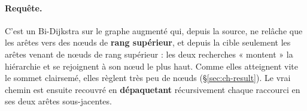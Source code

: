 \paragraph{Requête.} C'est un Bi-Dijkstra sur le graphe augmenté qui, depuis la
source, ne relâche que les arêtes vers des nœuds de \textbf{rang supérieur}, et
depuis la cible seulement les arêtes venant de nœuds de rang supérieur : les deux
recherches « montent » la hiérarchie et se rejoignent à son nœud le plus haut.
Comme elles atteignent vite le sommet clairsemé, elles règlent très peu de nœuds
(\S\ref{sec:ch-result}). Le vrai chemin est ensuite recouvré en
\textbf{dépaquetant} récursivement chaque raccourci en ses deux arêtes
sous-jacentes.
